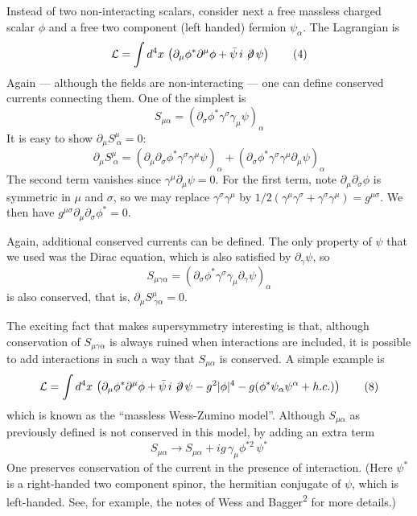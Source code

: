 Instead of two non-interacting scalars, consider next a free
massless charged scalar $\phi$ and a free two component (left handed)
fermion $\psi_\alpha$. The Lagrangian is
\begin{equation}
\mathcal{L} = \int d^4x\, \left(\partial_\mu \phi^* \partial^\mu \phi + \bar\psi\, i \not\!\partial\, \psi \right)
\tag{4}
\end{equation}
Again --- although the fields are non-interacting --- one can define
conserved currents connecting them. One of the simplest is\begingroup\renewcommand{\thefootnote}{\fnsymbol{footnote}}\footnotemark[1]\endgroup
\begin{equation}
S_{\mu\alpha} = \left(\partial_\sigma \phi^* \gamma^\sigma \gamma_\mu \psi\right)_\alpha
\tag{5}
\end{equation}
It is easy to show $\partial_\mu S^\mu_{\ \alpha} = 0$:
\begin{equation}
\partial_\mu S^\mu_{\ \alpha} = \left(\partial_\mu \partial_\sigma \phi^* \gamma^\sigma \gamma^\mu \psi\right)_\alpha + \left(\partial_\sigma \phi^* \gamma^\sigma \gamma^\mu \partial_\mu \psi\right)_\alpha
\tag{6}
\end{equation}
The second term vanishes since $\gamma^\mu \partial_\mu \psi = 0$. For the first term, note
$\partial_\mu \partial_\sigma \phi$ is symmetric in $\mu$ and $\sigma$, so we may replace $\gamma^\sigma \gamma^\mu$ by
$1/2(\gamma^\mu \gamma^\sigma + \gamma^\sigma \gamma^\mu) = g^{\mu\sigma}$. We then have $g^{\mu\sigma}\partial_\mu \partial_\sigma \phi^* = 0$.

Again, additional conserved currents can be defined. The only
property of $\psi$ that we used was the Dirac equation, which is also
satisfied by $\partial_\gamma \psi$, so
\begin{equation}
S_{\mu\gamma\alpha} = \left(\partial_\sigma \phi^* \gamma^\sigma \gamma_\mu \partial_\gamma \psi\right)_\alpha
\tag{7}
\end{equation}
is also conserved, that is, $\partial_\mu S^\mu_{\ \gamma\alpha} = 0$.

The exciting fact that makes supersymmetry interesting is that,
although conservation of $S_{\mu\gamma\alpha}$ is always ruined when interactions are
included, it is possible to add interactions in such a way that $S_{\mu\alpha}$
is conserved. A simple example is
\begin{equation}
\mathcal{L} = \int d^4x\, \left(\partial_\mu \phi^* \partial^\mu \phi + \bar\psi\, i \not\!\partial\, \psi - g^2 |\phi|^4 - g(\phi^* \psi_\alpha \psi^\alpha + h.c.)\right)
\tag{8}
\end{equation}
which is known as the ``massless Wess-Zumino model''. Although $S_{\mu\alpha}$
as previously defined is not conserved in this model, by adding an
extra term
\begin{equation}
S_{\mu\alpha} \rightarrow S_{\mu\alpha} + i g\, \gamma_\mu \phi^{*2}\, \psi^*
\tag{9}
\end{equation}
One preserves conservation of the current in the presence of
interaction. (Here $\psi^*$ is a right-handed two component spinor, the
hermitian conjugate of $\psi$, which is left-handed. See, for example, the
notes of Wess and Bagger\textsuperscript{2} for more details.)

